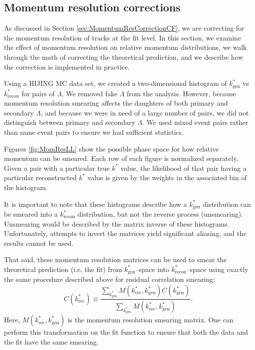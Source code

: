 \subsection{Momentum resolution corrections}
\label{sec:MomResCorrectFit}

As discussed in Section \ref{sec:MomentumResCorrectionCF}, we are correcting for the momentum resolution of tracks at the fit level. 
In this section, we examine the effect of momentum resolution on relative momentum distributions, we walk through the math of correcting the theoretical prediction, and we describe how the correction is implemented in practice.

Using a HIJING MC data set, we created a two-dimensional histogram of $k^*_\mathrm{gen}$ vs $k^*_\mathrm{recon}$ for pairs of $\Lambda$.
We removed fake $\Lambda$ from the analysis.
However, because momentum resolution smearing affects the daughters of both primary and secondary $\Lambda$, and because we were in need of a large number of pairs, we did not distinguish between primary and secondary $\Lambda$.
We used mixed event pairs rather than same event pairs to ensure we had sufficient statistics.



Figures \ref{fig:MomResLL} show the possible phase space for how relative momentum can be smeared.
Each row of each figure is normalized separately.
Given a pair with a particular true $k^*$ value, the likelihood of that pair having a particular reconstructed $k^*$ value is given by the weights in the associated bin of the histogram.

It is important to note that these histograms describe how a $k^*_\mathrm{gen}$ distribution can be smeared into a $k^*_\mathrm{recon}$ distribution, but not the reverse process (unsmearing).
Unsmearing would be described by the matrix inverse of these histograms.
Unfortunately, attempts to invert the matrices yield significant aliasing, and the results cannot be used.

That said, these momentum resolution matrices can be used to smear the theoretical prediction (i.e. the fit) from $k^*_\mathrm{gen}$--space into $k^*_\mathrm{recon}$--space using exactly the same procedure described above for residual correlation smearing:
\begin{equation}
\label{eq:MomResSmear}
C(k^*_{\mathrm{rec}}) \equiv \frac{\displaystyle\sum\limits_{k^*_{\mathrm{gen}}}M(k^*_{\mathrm{rec}},k^*_{\mathrm{gen}})C(k^*_{\mathrm{gen}})}{\displaystyle\sum\limits_{k^*_{\mathrm{gen}}}M(k^*_{\mathrm{rec}},k^*_{\mathrm{gen}})}.
\end{equation} 
Here, $M(k^*_{\mathrm{rec}},k^*_{\mathrm{gen}})$ is the momentum resolution smearing matrix.
One can perform this transformation on the fit function to ensure that both the data and the fit have the same smearing. 

